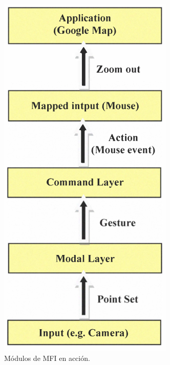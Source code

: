 \begin{center}
  \begin{figure}[h]
    \centering

    \includegraphics[scale=0.5]{gfx/mfi_modules_action}
    \caption{Módulos de MFI en acción.}
    \label{fig:mfi_action}
  \end{figure}
\end{center}

